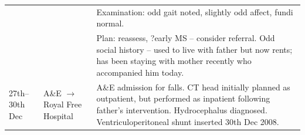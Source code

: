 \begin{longtable}{
  >{\raggedright\arraybackslash}p{3.0cm}
  >{\raggedright\arraybackslash}p{3.3cm}
  >{\raggedright\arraybackslash}p{9.2cm}
}
& & Examination: odd gait noted, slightly odd affect, fundi normal. \\
& & Plan: reassess, ?early MS – consider referral. Odd social history – used to live with father but now rents; has been staying with mother recently who accompanied him today. \\
\midrule
27th–30th Dec & A\&E $\to$ Royal Free Hospital
& A\&E admission for falls. CT head initially planned as outpatient, but performed as inpatient following father’s intervention. Hydrocephalus diagnosed. Ventriculoperitoneal shunt inserted 30th Dec 2008. \\
\end{longtable}